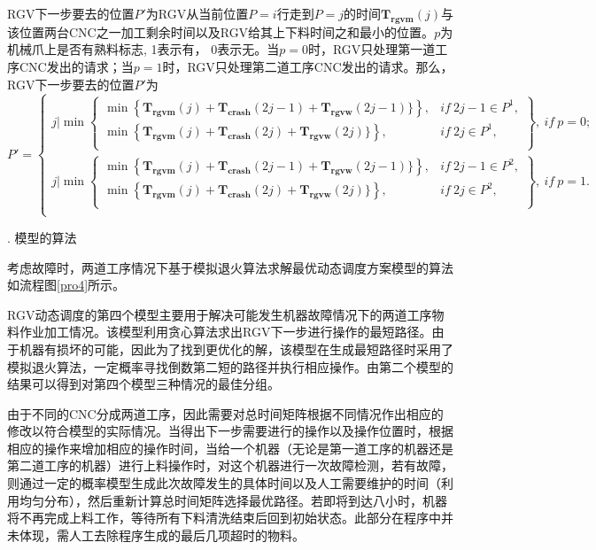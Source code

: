\documentclass[no-math,withoutpreface,bwprint]{cumcmthesis} %
\numberwithin{equation}{section}
\numberwithin{figure}{section}
\numberwithin{table}{section}
\begin{document}
\begin{principle}
RGV下一步要去的位置$P'$为RGV从当前位置$P=i$行走到$P=j$的时间$\mathbf{T_{rgvm}}(j)$与该位置两台CNC之一加工剩余时间以及RGV给其上下料时间之和最小的位置。$p$为机械爪上是否有熟料标志, {\rm1}表示有， {\rm0}表示无。当$p=0$时，RGV只处理第一道工序CNC发出的请求；当$p=1$时，RGV只处理第二道工序CNC发出的请求。那么，RGV下一步要去的位置$P'$为
\begin{equation}
P'=\left\{\begin{array}{l}
j\Bigg|\min\left\{\begin{array}{ll}
\min\left\{\mathbf{T_{rgvm}}(j)+\mathbf{T_{crash}}(2j-1)+\mathbf{T_{rgvw}}(2j-1)\}\right\},& if\ 2j-1\in P^1,\\
\min\left\{\mathbf{T_{rgvm}}(j)+\mathbf{T_{crash}}(2j)+\mathbf{T_{rgvw}}(2j)\}\right\},& if\ 2j\in P^1,\\
\end{array}\right\},\ if\ p=0;\\
j\Bigg|\min\left\{\begin{array}{ll}
\min\left\{\mathbf{T_{rgvm}}(j)+\mathbf{T_{crash}}(2j-1)+\mathbf{T_{rgvw}}(2j-1)\}\right\},& if\ 2j-1\in P^2,\\
\min\left\{\mathbf{T_{rgvm}}(j)+\mathbf{T_{crash}}(2j)+\mathbf{T_{rgvw}}(2j)\}\right\},& if\ 2j\in P^2,\\
\end{array}\right\},\ if\ p=1.\\
\end{array}\right.
\end{equation}

\end{principle}

. 模型的算法

考虑故障时，两道工序情况下基于模拟退火算法求解最优动态调度方案模型的算法如流程图\ref{pro4}所示。

RGV动态调度的第四个模型主要用于解决可能发生机器故障情况下的两道工序物料作业加工情况。该模型利用贪心算法求出RGV下一步进行操作的最短路径。由于机器有损坏的可能，因此为了找到更优化的解，该模型在生成最短路径时采用了模拟退火算法，一定概率寻找倒数第二短的路径并执行相应操作。由第二个模型的结果可以得到对第四个模型三种情况的最佳分组。

由于不同的CNC分成两道工序，因此需要对总时间矩阵根据不同情况作出相应的修改以符合模型的实际情况。当得出下一步需要进行的操作以及操作位置时，根据相应的操作来增加相应的操作时间，当给一个机器（无论是第一道工序的机器还是第二道工序的机器）进行上料操作时，对这个机器进行一次故障检测，若有故障，则通过一定的概率模型生成此次故障发生的具体时间以及人工需要维护的时间（利用均匀分布），然后重新计算总时间矩阵选择最优路径。若即将到达八小时，机器将不再完成上料工作，等待所有下料清洗结束后回到初始状态。此部分在程序中并未体现，需人工去除程序生成的最后几项超时的物料。
\end{document}
